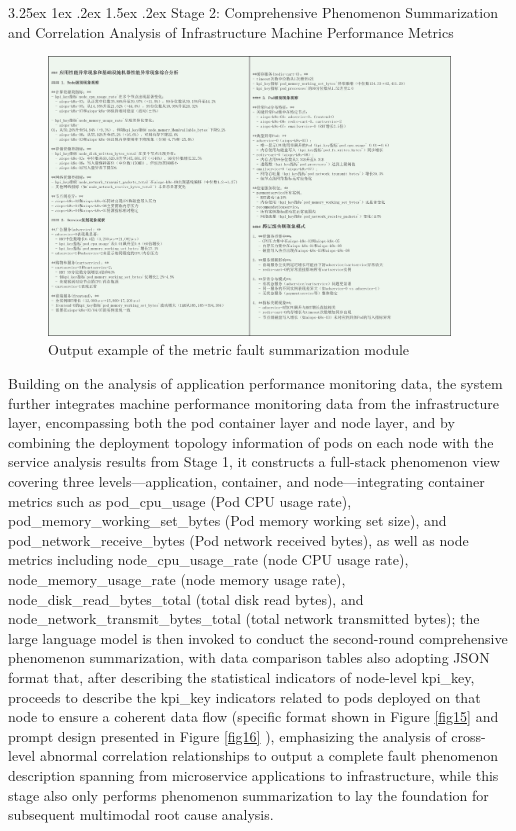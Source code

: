 \documentclass[10pt]{article}
\makeatletter
\let\oldref\ref
\renewcommand{\ref}[1]{%
    \textcolor{blue}{\oldref{#1}}%
}
\renewcommand{\paragraph}{%
    \@startsection{paragraph}{4}{\z@}%
    {3.25ex \@plus1ex \@minus.2ex}%
    {1.5ex \@plus.2ex}%
    {\normalfont\normalsize\itshape}%
}
\makeatother
\begin{document}
\paragraph{Stage 2: Comprehensive Phenomenon Summarization and Correlation Analysis of Infrastructure Machine Performance Metrics}

\begin{figure}[!t]
    \centering
    \includegraphics[width=0.95\textwidth]{pics/fig17.png}
    \caption{Output example of the metric fault summarization module}
    \label{fig17}
\end{figure}

Building on the analysis of application performance monitoring data, the system further integrates machine performance monitoring data from the infrastructure layer, encompassing both the pod container layer and node layer, and by combining the deployment topology information of pods on each node with the service analysis results from Stage 1, it constructs a full-stack phenomenon view covering three levels—application, container, and node—integrating container metrics such as pod\_cpu\_usage (Pod CPU usage rate), pod\_memory\_working\_set\_bytes (Pod memory working set size), and pod\_network\_receive\_bytes (Pod network received bytes), as well as node metrics including node\_cpu\_usage\_rate (node CPU usage rate), node\_memory\_usage\_rate (node memory usage rate), node\_disk\_read\_bytes\_total (total disk read bytes), and node\_network\_transmit\_bytes\_total (total network transmitted bytes); the large language model is then invoked to conduct the second-round comprehensive phenomenon summarization, with data comparison tables also adopting JSON format that, after describing the statistical indicators of node-level kpi\_key, proceeds to describe the kpi\_key indicators related to pods deployed on that node to ensure a coherent data flow (specific format shown in Figure \ref{fig15} and prompt design presented in Figure \ref{fig16}), emphasizing the analysis of cross-level abnormal correlation relationships to output a complete fault phenomenon description spanning from microservice applications to infrastructure, while this stage also only performs phenomenon summarization to lay the foundation for subsequent multimodal root cause analysis.
\end{document}
